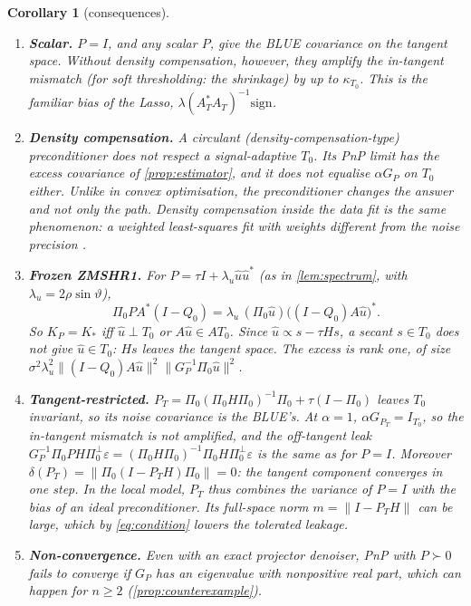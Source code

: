 \documentclass[11pt]{article}
\newtheorem{corollary}[theorem]{Corollary}
\theoremstyle{definition}
\theoremstyle{remark}
\newcommand{\norm}[1]{\lVert #1\rVert}
\begin{document}
\begin{corollary}[consequences]\label{cor:precond}
\begin{enumerate}
\item \textbf{Scalar.} $P=I$, and any scalar $P$, give the BLUE covariance on the tangent space. Without
  density compensation, however, they amplify the in-tangent mismatch (for soft thresholding: the shrinkage) by up
  to $\kappa_{T_0}$. This is the familiar bias of the Lasso, $\lambda(A_T^*A_T)^{-1}\mathrm{sign}$.
\item \textbf{Density compensation.} A circulant (density-compensation-type) preconditioner does not respect a
  signal-adaptive $T_0$. Its PnP limit has the excess covariance of \cref{prop:estimator}, and it does not
  equalise $\alpha G_P$ on $T_0$ either. Unlike in convex optimisation, the preconditioner changes the answer and
  not only the path. Density compensation inside the data fit is the same phenomenon: a weighted least-squares
  fit with weights different from the noise precision \cite{pipe1999,pruessmann2001}.
\item \textbf{Frozen ZMSHR1.} For $P=\tau I+\lambda_u\hat u\hat u^*$ (as in \cref{lem:spectrum}, with
  $\lambda_u=2\rho\sin\vartheta$),
  \[
  \Pi_0PA^*(I-Q_0)=\lambda_u\,(\Pi_0\hat u)\big((I-Q_0)A\hat u\big)^* .
  \]
  So $K_P=K_*$ iff $\hat u\perp T_0$ or $A\hat u\in AT_0$. Since $\hat u\propto s-\tau Hs$, a secant
  $s\in T_0$ does \emph{not} give $\hat u\in T_0$: $Hs$ leaves the tangent space. The excess is rank one, of size
  $\sigma^2\lambda_u^2\norm{(I-Q_0)A\hat u}^2\norm{G_P^{-1}\Pi_0\hat u}^2$.
\item \textbf{Tangent-restricted.} $P_T=\Pi_0(\Pi_0H\Pi_0)^{-1}\Pi_0+\tau(I-\Pi_0)$ leaves $T_0$ invariant, so its
  noise covariance is the BLUE's. At $\alpha=1$, $\alpha G_{P_T}=I_{T_0}$, so the in-tangent mismatch is not
  amplified, and the off-tangent leak $G_P^{-1}\Pi_0PH\Pi_0^\perp\varepsilon=(\Pi_0H\Pi_0)^{-1}\Pi_0H\Pi_0^\perp\varepsilon$ is
  the same as for $P=I$. Moreover $\delta(P_T)=\norm{\Pi_0(I-P_TH)\Pi_0}=0$: the tangent component converges in
  one step. In the local model, $P_T$ thus combines the variance of $P=I$ with the bias of an ideal preconditioner.
  Its full-space norm $m=\norm{I-P_TH}$ can be large, which by \eqref{eq:condition} lowers the tolerated leakage.
\item \textbf{Non-convergence.} Even with an exact projector denoiser, PnP with $P\succ0$ fails to converge if $G_P$ has an
  eigenvalue with nonpositive real part, which can happen for $n\geq2$ (\cref{prop:counterexample}).
\end{enumerate}
\end{corollary}
\end{document}
